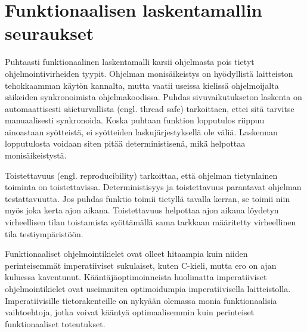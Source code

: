 \section{Funktionaalisen laskentamallin seuraukset}
Puhtaasti funktionaalinen laskentamalli karsii ohjelmasta pois tietyt ohjelmointivirheiden tyypit. Ohjelman
monisäikeistys on hyödyllistä laitteiston tehokkaamman käytön kannalta, mutta vaatii useissa kielissä ohjelmoijalta
säikeiden synkronoimista ohjelmakoodissa. Puhdas sivuvaikutukseton laskenta on automaattisesti säieturvallista (engl.
thread safe) tarkoittaen, ettei sitä tarvitse manuaalisesti synkronoida. Koska puhtaan funktion lopputulos riippuu
ainoastaan syötteistä, ei syötteiden laskujärjestyksellä ole väliä. Laskennan lopputulosta voidaan siten pitää
deterministisenä, mikä helpottaa monisäikeistystä.

Toistettavuus (engl. reproducibility) tarkoittaa, että ohjelman tietynlainen toiminta on toistettavissa.
Deterministisyys ja toistettavuus parantavat ohjelman testattavuutta. Jos puhdas funktio toimii tietyllä tavalla kerran,
se toimii niin myös joka kerta ajon aikana. Toistettavuus helpottaa ajon aikana löydetyn virheellisen tilan toistamista
syöttämällä sama tarkkaan määritetty virheellinen tila testiympäristöön. \cite{functionaljava}

Funktionaaliset ohjelmointikielet ovat olleet hitaampia kuin niiden perinteisemmät imperatiiviset sukulaiset, kuten
C-kieli, mutta ero on ajan kuluessa kaventunut. Kääntäjäoptimoinneista huolimatta imperatiiviset ohjelmointikielet
ovat useimmiten optimoidumpia imperatiivisella laitteistolla. Imperatiivisille tietorakenteille on nykyään olemassa
monia funktionaalisia vaihtoehtoja, jotka voivat kääntyä optimaalisemmin kuin perinteiset funktionaaliset toteutukset.
\cite{functionaldatastructures}
